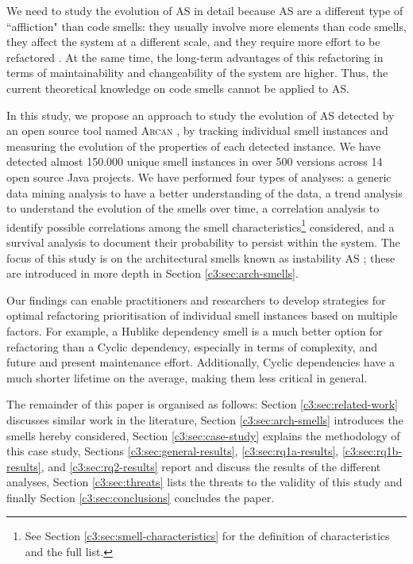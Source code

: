 We need to study the evolution of AS in detail because AS are a different type of ``affliction" than code smells: they usually involve more elements than code smells, they affect the system at a different scale, and they require more effort to be refactored \cite{Lippert2006}. At the same time,  the long-term advantages of this refactoring in terms of maintainability and changeability of the system are higher. Thus, the current theoretical knowledge on code smells cannot be applied to AS.

In this study, we propose an approach to study the evolution of AS detected by an open source tool named \textsc{Arcan} \cite{Arcelli2017}, by tracking individual smell instances and measuring the evolution of the properties of each detected instance. We have detected almost 150.000 unique smell instances in over 500 versions across 14 open source Java projects.
We have performed four types of analyses: a generic data mining analysis to have a better understanding of the data, a trend analysis to understand the evolution of the smells over time, a correlation analysis to identify possible correlations among the smell characteristics\footnote{See Section \ref{c3:sec:smell-characteristics} for the definition of characteristics and the full list.} considered, and a survival analysis to document their probability to persist within the system.
The focus of this study is on the architectural smells known as instability AS \cite{Arcelli2016}; these are introduced in more depth in Section \ref{c3:sec:arch-smells}.

Our findings can enable practitioners and researchers to develop strategies for optimal refactoring prioritisation of individual smell instances based on multiple factors.
For example, a Hublike dependency smell is a much better option for refactoring than a Cyclic dependency, especially in terms of complexity, and future and present maintenance effort.
Additionally, Cyclic dependencies have a much shorter lifetime on the average, making them less critical in general.

The remainder of this paper is organised as follows: Section \ref{c3:sec:related-work} discusses similar work in the literature, Section \ref{c3:sec:arch-smells} introduces the smells hereby considered, Section \ref{c3:sec:case-study} explains the methodology of this case study, Sections \ref{c3:sec:general-results}, \ref{c3:sec:rq1a-results}, \ref{c3:sec:rq1b-results}, and \ref{c3:sec:rq2-results} report and discuss the results of the different analyses, Section \ref{c3:sec:threats} lists the threats to the validity of this study and finally Section \ref{c3:sec:conclusions} concludes the paper.

